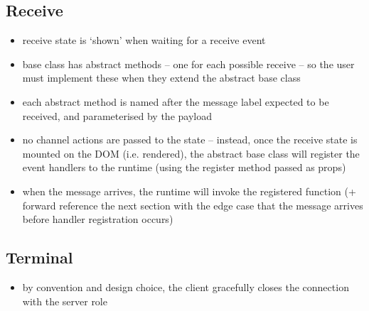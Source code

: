 \subsection{Receive}
\begin{itemize}
\item receive state is `shown' when waiting for a receive event
\item base class has abstract methods -- one for each possible receive -- so the user must implement these when they extend the abstract base class
\item each abstract method is named after the message label expected to be received, and parameterised by the payload
\item no channel actions are passed to the state -- instead, once the receive state is mounted on the DOM (i.e. rendered), the abstract base class will register the event handlers to the runtime (using the register method passed as props)
\item when the message arrives, the runtime will invoke the registered function (+ forward reference the next section with the edge case that the message arrives before handler registration occurs)
\end{itemize}

\subsection{Terminal}
\begin{itemize}
\item by convention and design choice, the client gracefully closes the connection with the server role
\end{itemize}